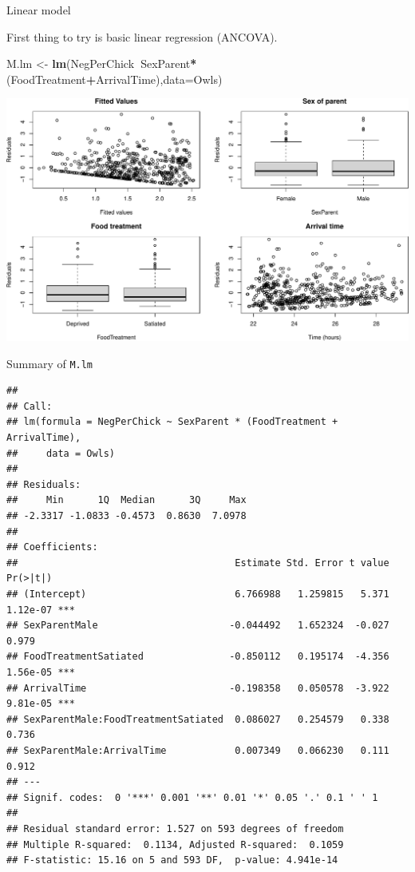 \documentclass[
  ignorenonframetext,
]{beamer}
\newenvironment{Shaded}{\begin{snugshade}}{\end{snugshade}}
\newcommand{\DataTypeTok}[1]{\textcolor[rgb]{0.13,0.29,0.53}{#1}}
\newcommand{\KeywordTok}[1]{\textcolor[rgb]{0.13,0.29,0.53}{\textbf{#1}}}
\newcommand{\NormalTok}[1]{#1}
\newcommand{\OperatorTok}[1]{\textcolor[rgb]{0.81,0.36,0.00}{\textbf{#1}}}
\newcommand{\StringTok}[1]{\textcolor[rgb]{0.31,0.60,0.02}{#1}}
\begin{document}
\begin{frame}[fragile]{Linear model}
\protect\hypertarget{linear-model}{}

First thing to try is basic linear regression (ANCOVA).

\scriptsize

\begin{Shaded}
\begin{Highlighting}[]
\NormalTok{M.lm <-}\StringTok{ }\KeywordTok{lm}\NormalTok{(NegPerChick}\OperatorTok{~}\NormalTok{SexParent}\OperatorTok{*}\NormalTok{(FoodTreatment}\OperatorTok{+}\NormalTok{ArrivalTime),}\DataTypeTok{data=}\NormalTok{Owls)}
\end{Highlighting}
\end{Shaded}

\includegraphics{mixed_models_files/figure-beamer/unnamed-chunk-8-1.pdf}

\end{frame}

\begin{frame}[fragile]{Summary of \texttt{M.lm}}
\protect\hypertarget{summary-of-m.lm}{}

\tiny

\begin{verbatim}
## 
## Call:
## lm(formula = NegPerChick ~ SexParent * (FoodTreatment + ArrivalTime), 
##     data = Owls)
## 
## Residuals:
##     Min      1Q  Median      3Q     Max 
## -2.3317 -1.0833 -0.4573  0.8630  7.0978 
## 
## Coefficients:
##                                      Estimate Std. Error t value Pr(>|t|)    
## (Intercept)                          6.766988   1.259815   5.371 1.12e-07 ***
## SexParentMale                       -0.044492   1.652324  -0.027    0.979    
## FoodTreatmentSatiated               -0.850112   0.195174  -4.356 1.56e-05 ***
## ArrivalTime                         -0.198358   0.050578  -3.922 9.81e-05 ***
## SexParentMale:FoodTreatmentSatiated  0.086027   0.254579   0.338    0.736    
## SexParentMale:ArrivalTime            0.007349   0.066230   0.111    0.912    
## ---
## Signif. codes:  0 '***' 0.001 '**' 0.01 '*' 0.05 '.' 0.1 ' ' 1
## 
## Residual standard error: 1.527 on 593 degrees of freedom
## Multiple R-squared:  0.1134, Adjusted R-squared:  0.1059 
## F-statistic: 15.16 on 5 and 593 DF,  p-value: 4.941e-14
\end{verbatim}

\end{frame}
\end{document}
